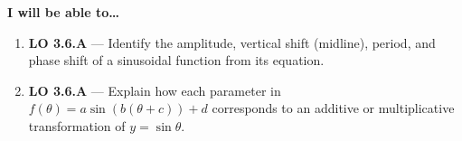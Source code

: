 \documentclass[10pt]{article}
\begin{document}
\namedateperiod

\vspace{0.10in}

\begin{objectivebox}
\textbf{I will be able to\ldots}
\begin{enumerate}[leftmargin=1.5em, itemsep=4pt]
  \item \textbf{LO 3.6.A} --- Identify the amplitude, vertical shift (midline),
    period, and phase shift of a sinusoidal function from its equation. \writeline
  \item \textbf{LO 3.6.A} --- Explain how each parameter in $f(\theta)=a\sin(b(\theta+c))+d$
    corresponds to an additive or multiplicative transformation of $y=\sin\theta$. \writeline
\end{enumerate}
\end{objectivebox}

\vspace{0.08in}
\end{document}
